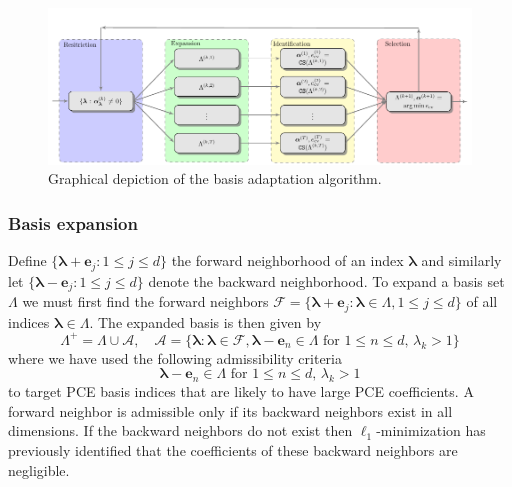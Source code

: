\begin{figure}
\hspace{-2cm}\includegraphics[width=1.3\textwidth]{images/basis-adaptation-algorithm-summary}
\caption{Graphical depiction of the basis adaptation algorithm.}
\label{fig:basis-selection-alg}
\end{figure}
\subsubsection{Basis expansion} \label{sec:basisexp}

Define $\{\boldsymbol{\lambda}+\mathbf{e}_j:1\le j\le d\}$ the forward neighborhood of an index $\boldsymbol{\lambda}$ and similarly let $\{\boldsymbol{\lambda}-\mathbf{e}_j:1\le j\le d\}$ denote the backward neighborhood.
To expand a basis set $\Lambda$ we must first find the forward neighbors $\mathcal{F}=\{\boldsymbol{\lambda}+\mathbf{e}_j : \boldsymbol{\lambda}\in\Lambda, 1\le j\le d \}$ of all indices $\boldsymbol{\lambda}\in\Lambda$.
The expanded basis is then given by 
\[
\Lambda^+=\Lambda\cup\mathcal{A},\quad \mathcal{A}=\{\boldsymbol{\lambda}: \boldsymbol{\lambda}\in\mathcal{F}, \boldsymbol{\lambda}-\mathbf{e}_n\in\Lambda\text{ for }1\le n\le d,\, \lambda_k > 1\}
\]
where we have used the following admissibility criteria 
\begin{equation}
\label{eq:admissibility}
\boldsymbol{\lambda}-\mathbf{e}_n\in\Lambda\text{ for }1\le n\le d,\, \lambda_k > 1
\end{equation}
to target PCE basis indices that are likely to have large PCE coefficients. A forward neighbor is admissible only if its backward neighbors exist in all dimensions. 
If the backward neighbors do not exist then $\ell_1$-minimization has previously identified that the coefficients of these backward neighbors are negligible. 

